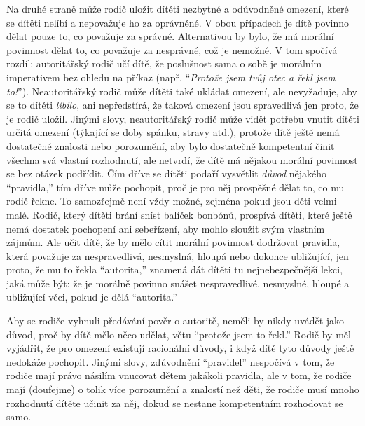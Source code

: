 \documentclass{book}
\begin{document}
Na druhé straně může rodič uložit dítěti nezbytné a odůvodněné omezení, které se dítěti nelíbí a nepovažuje ho za oprávněné. V obou případech je dítě povinno dělat pouze to, co považuje za správné. Alternativou by bylo, že má morální povinnost dělat to, co považuje za nesprávné, což je nemožné. V tom spočívá rozdíl: autoritářský rodič učí dítě, že poslušnost sama o sobě je morálním imperativem bez ohledu na příkaz (např. \enquote{\emph{Protože jsem tvůj otec a řekl jsem to!}}). Neautoritářský rodič může dítěti také ukládat omezení, ale nevyžaduje, aby se to dítěti \emph{líbilo}, ani nepředstírá, že taková omezení jsou spravedlivá jen proto, že je rodič uložil. Jinými slovy, neautoritářský rodič může vidět potřebu vnutit dítěti určitá omezení (týkající se doby spánku, stravy atd.), protože dítě ještě nemá dostatečné znalosti nebo porozumění, aby bylo dostatečně kompetentní činit všechna svá vlastní rozhodnutí, ale netvrdí, že dítě má nějakou morální povinnost se bez otázek podřídit. Čím dříve se dítěti podaří vysvětlit \emph{důvod} nějakého \enquote{pravidla,} tím dříve může pochopit, proč je pro něj prospěšné dělat to, co mu rodič řekne. To samozřejmě není vždy možné, zejména pokud jsou děti velmi malé. Rodič, který dítěti brání sníst balíček bonbónů, prospívá dítěti, které ještě nemá dostatek pochopení ani sebeřízení, aby mohlo sloužit svým vlastním zájmům. Ale učit dítě, že by mělo cítit morální povinnost dodržovat pravidla, která považuje za nespravedlivá, nesmyslná, hloupá nebo dokonce ubližující, jen proto, že mu to řekla \enquote{autorita,} znamená dát dítěti tu nejnebezpečnější lekci, jaká může být: že je morálně povinno snášet nespravedlivé, nesmyslné, hloupé a ubližující věci, pokud je dělá \enquote{autorita.}

Aby se rodiče vyhnuli předávání pověr o autoritě, neměli by nikdy uvádět jako důvod, proč by dítě mělo něco udělat, větu \enquote{protože jsem to řekl.} Rodič by měl vyjádřit, že pro omezení existují racionální důvody, i když dítě tyto důvody ještě nedokáže pochopit. Jinými slovy, zdůvodnění \enquote{pravidel} nespočívá v tom, že rodiče mají právo násilím vnucovat dětem jakákoli pravidla, ale v tom, že rodiče mají (doufejme) o tolik více porozumění a znalostí než děti, že rodiče musí mnoho rozhodnutí dítěte učinit za něj, dokud se nestane kompetentním rozhodovat se samo.
\end{document}
